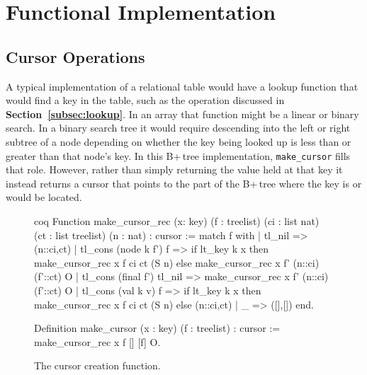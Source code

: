 \documentclass[12pt]{article}
\begin{document}
\clearpage

\section{Functional Implementation} \label{sec:func}

\subsection{Cursor Operations} \label{subsec:cursorop}

A typical implementation of a relational table would have a lookup function that would find a key in the table, such as the operation discussed in \textbf{Section~\ref{subsec:lookup}}. In an array that function might be a linear or binary search. In a binary search tree it would require descending into the left or right subtree of a node depending on whether the key being looked up is less than or greater than that node’s key. In this B+\,tree implementation, \texttt{make\_cursor} fills that role. However, rather than simply returning the value held at that key it instead returns a cursor that points to the part of the B+\,tree where the key is or would be located.

\begin{singlespace}
\begin{figure}[ht]
\centering
\begin{cminted}{coq}
Function make_cursor_rec (x: key) (f : treelist) (ci : list nat)
  (ct : list treelist) (n : nat) : cursor :=
  match f with
  | tl_nil => (n::ci,ct)
  | tl_cons (node k f') f =>
    if lt_key k x then make_cursor_rec x f ci ct (S n)
    else make_cursor_rec x f' (n::ci) (f'::ct) O
  | tl_cons (final f') tl_nil =>
    make_cursor_rec x f' (n::ci) (f'::ct) O
  | tl_cons (val k v) f =>
    if lt_key k x then make_cursor_rec x f ci ct (S n)
    else (n::ci,ct)
  | _ => ([],[])
  end.

Definition make_cursor (x : key) (f : treelist) : cursor :=
  make_cursor_rec x f [] [f] O.
\end{cminted}
\caption{The cursor creation function.}
\end{figure}
\end{singlespace}
\end{document}
